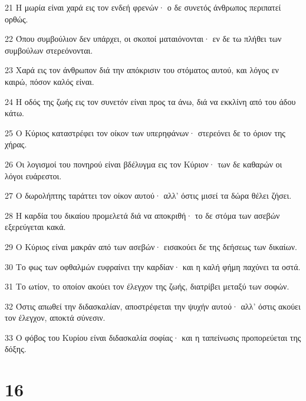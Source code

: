 \par 21 Η μωρία είναι χαρά εις τον ενδεή φρενών· ο δε συνετός άνθρωπος περιπατεί ορθώς.
\par 22 Όπου συμβούλιον δεν υπάρχει, οι σκοποί ματαιόνονται· εν δε τω πλήθει των συμβούλων στερεόνονται.
\par 23 Χαρά εις τον άνθρωπον διά την απόκρισιν του στόματος αυτού, και λόγος εν καιρώ, πόσον καλός είναι.
\par 24 Η οδός της ζωής εις τον συνετόν είναι προς τα άνω, διά να εκκλίνη από του άδου κάτω.
\par 25 Ο Κύριος καταστρέφει τον οίκον των υπερηφάνων· στερεόνει δε το όριον της χήρας.
\par 26 Οι λογισμοί του πονηρού είναι βδέλυγμα εις τον Κύριον· των δε καθαρών οι λόγοι ευάρεστοι.
\par 27 Ο δωρολήπτης ταράττει τον οίκον αυτού· αλλ' όστις μισεί τα δώρα θέλει ζήσει.
\par 28 Η καρδία του δικαίου προμελετά διά να αποκριθή· το δε στόμα των ασεβών εξερεύγεται κακά.
\par 29 Ο Κύριος είναι μακράν από των ασεβών· εισακούει δε της δεήσεως των δικαίων.
\par 30 Το φως των οφθαλμών ευφραίνει την καρδίαν· και η καλή φήμη παχύνει τα οστά.
\par 31 Το ωτίον, το οποίον ακούει τον έλεγχον της ζωής, διατρίβει μεταξύ των σοφών.
\par 32 Όστις απωθεί την διδασκαλίαν, αποστρέφεται την ψυχήν αυτού· αλλ' όστις ακούει τον έλεγχον, αποκτά σύνεσιν.
\par 33 Ο φόβος του Κυρίου είναι διδασκαλία σοφίας· και η ταπείνωσις προπορεύεται της δόξης.

\chapter{16}

